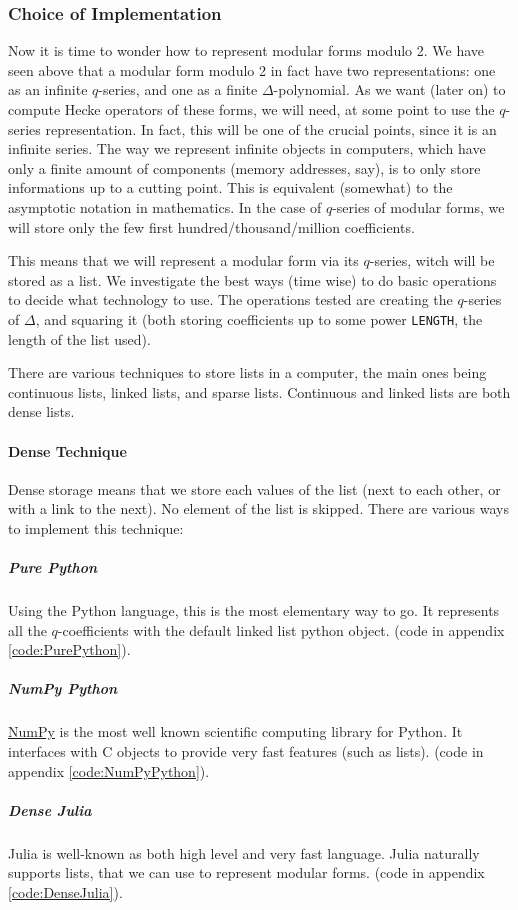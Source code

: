 \subsubsection{Choice of Implementation}
Now it is time to wonder how to represent modular forms modulo 2.
We have seen above that a modular form modulo 2 in fact have two representations: one as an infinite $q$-series, and one as a finite $\Delta$-polynomial.
As we want (later on) to compute Hecke operators of these forms, we will need, at some point to use the $q$-series representation.
In fact, this will be one of the crucial points, since it is an infinite series.
The way we represent infinite objects in computers, which have only a finite amount of components (memory addresses, say), is to only store informations up to a cutting point.
This is equivalent (somewhat) to the asymptotic notation in mathematics.
In the case of $q$-series of modular forms, we will store only the few first hundred/thousand/million coefficients.

This means that we will represent a modular form via its $q$-series, witch will be stored as a list.
We investigate the best ways (time wise) to do basic operations to decide what technology to use.
The operations tested are creating the $q$-series of $\Delta$, and squaring it (both storing coefficients up to some power \texttt{LENGTH}, the length of the list used).

There are various techniques to store lists in a computer, the main ones being continuous lists, linked lists, and sparse lists.
Continuous and linked lists are both dense lists.

\paragraph{Dense Technique}
Dense storage means that we store each values of the list (next to each other, or with a link to the next).
No element of the list is skipped.
There are various ways to implement this technique:
\subparagraph{Pure Python}
Using the Python language, this is the most elementary way to go.
It represents all the $q$-coefficients with the default linked list python object.
(code in appendix \ref{code:PurePython}).
\subparagraph{NumPy Python}
\href{https://fr.wikipedia.org/wiki/NumPy}{NumPy} is the most well known scientific computing library for Python.
It interfaces with C objects to provide very fast features (such as lists).
(code in appendix \ref{code:NumPyPython}).
\subparagraph{Dense Julia}
Julia is well-known as both high level and very fast language.
Julia naturally supports lists, that we can use to represent modular forms.
(code in appendix \ref{code:DenseJulia}).

